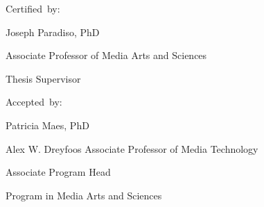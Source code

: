 \begin{addmargin}[1cm]{-2cm}
\begin{flushright}
  Certified~by:\hspace{0.5cm}~\makebox[2.75in]{\hrulefill}

Joseph Paradiso, PhD

Associate Professor of Media Arts and Sciences 
                                 
Thesis Supervisor

  \vspace{15mm}

  Accepted~by:\hspace{0.5cm}~\makebox[2.75in]{\hrulefill}

Patricia Maes, PhD

Alex W. Dreyfoos Associate Professor of Media Technology

Associate Program Head 

Program in Media Arts and Sciences
                                 
\end{flushright}

\end{addmargin}

